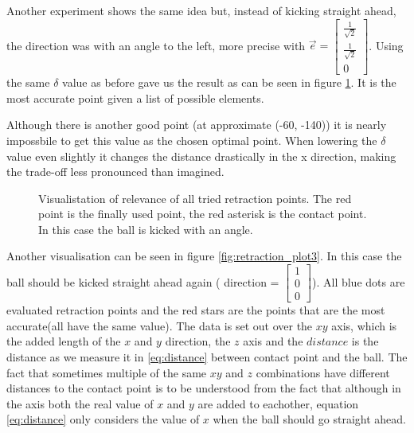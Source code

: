 \documentclass[a4paper]{article}
\begin{document}
Another experiment shows the same idea but, instead of kicking straight ahead,
the direction was with an angle to the left, more precise with  $\vec{e} =
\begin{bmatrix} \frac{1}{\sqrt{2}}\\
\frac{1}{\sqrt{2}} \\ 0 \end{bmatrix}$. Using the same $\delta$ value as before gave us
the result as can be seen in figure \ref{fig:retraction_plot2}. It is the most
accurate point given a list of possible elements. 

Although there is another good point (at approximate (-60, -140)) it is nearly
impossbile to get this value as the chosen optimal point. When lowering the
$\delta$ value even slightly it changes the distance drastically in the x
direction, making the trade-off less pronounced than imagined.

\begin{figure}[htbp]
  \centering
  \caption{Visualistation of relevance of all tried retraction points. The red
      point is the finally used point, the red asterisk is the contact point. 
      In this case the ball is kicked with an angle.
         }
  \label{fig:retraction_plot2}
\end{figure}

Another visualisation can be seen in figure \ref{fig:retraction_plot3}. In this
case the ball should be kicked straight ahead again ( direction = $\begin{bmatrix} 1 \\  0 \\ 0 \end{bmatrix}$). All blue dots are evaluated retraction points and the red stars are the points that are the most
accurate(all have the same value). The data is set out over the $xy$ axis, which
is the added length of the $x$ and $y$ direction, the $z$ axis and the
$distance$ is the distance as we measure it in \ref{eq:distance} between contact point and the ball. The fact that sometimes multiple of the same $xy$ and $z$
combinations have different distances to the contact point is to be understood from
the fact that although in the axis both the real value of $x$ and $y$ are added to
eachother, equation \ref{eq:distance} only considers the value of $x$ when the ball should go
straight ahead.
\end{document}
